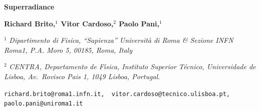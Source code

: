 \documentclass[11pt]{article}
\date{8 Jan 2021}
\numberwithin{equation}{section} %
\begin{document}
%
% 
%

\pagestyle{plain}
\setcounter{page}{1}

\begin{titlepage}

\begin{center}
\vspace*{-1cm}  

\vskip 2.0cm

{\huge {\bf Superradiance}}



\vskip 14mm

{\large  {\bf Richard Brito,$^{1}$ Vitor Cardoso,$^{2}$ Paolo Pani,$^{1}$}}

\vspace{0.5 cm}

 ${}^1$ {\it Dipartimento di Fisica, ``Sapienza'' Universit\`a di Roma \& Sezione INFN Roma1, P.A. Moro 5, 00185, Roma, 
Italy}

${}^2$ {\it CENTRA, Departamento de F\'{\i}sica, Instituto Superior
   T\'ecnico, Universidade de Lisboa, Av.~Rovisco Pais 1, 1049
   Lisboa, Portugal.}
    
     

{\tt  richard.brito@roma1.infn.it,\, vitor.cardoso@tecnico.ulisboa.pt, \, paolo.pani@uniroma1.it}

\vspace{5mm}


\end{center}
\end{titlepage}
\end{document}
